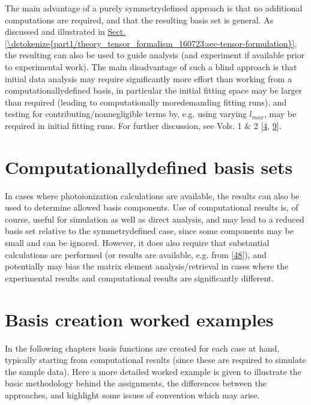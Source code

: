 \documentclass[letterpaper,table,10pt,english]{jupyterBook}
\begin{document}
\sphinxAtStartPar
The main advantage of a purely symmetry\sphinxhyphen{}defined approach is that no additional  computations are required, and that the resulting basis set is general. As discussed and illustrated in \hyperref[\detokenize{part1/theory_tensor_formalism_160723:sec-tensor-formulation}]{Sect.\@ \ref{\detokenize{part1/theory_tensor_formalism_160723:sec-tensor-formulation}}}, the resulting {\hyperref[\detokenize{backmatter/glossary:term-channel-functions}]{}} can also be used to guide analysis (and experiment if available prior to experimental work). The main disadvantage of such a blind approach is that initial data analysis may require significantly more effort than working from a computationally\sphinxhyphen{}defined basis, in particular the initial fitting space may be larger than required (leading to computationally more\sphinxhyphen{}demanding fitting runs), and testing for contributing/non\sphinxhyphen{}negligible terms by, e.g. using varying \(l_{max}\), may be required in initial fitting runs. For further discussion, see  Vols. 1 \& 2 {[}\hyperlink{cite.backmatter/bibliography:id675}{4}, \hyperlink{cite.backmatter/bibliography:id676}{9}{]}.


\section{Computationally\sphinxhyphen{}defined basis sets}
\label{\detokenize{part2/sym-fitting-intro_240723:computationally-defined-basis-sets}}
\sphinxAtStartPar
In cases where photoionization calculations are available, the results can also be used to determine allowed basis components. Use of  computational results is, of course, useful for simulation as well as direct analysis, and may lead to a reduced basis set relative to the symmetry\sphinxhyphen{}defined case, since some components may be small and can be ignored. However, it does also require that substantial calculations are performed (or results are available, e.g. from  {[}\hyperlink{cite.backmatter/bibliography:id677}{48}{]}), and \sphinxhyphen{} potentially \sphinxhyphen{} may bias the matrix element analysis/retrieval in cases where the experimental results and computational results are significantly different.


\section{Basis creation worked examples}
\label{\detokenize{part2/sym-fitting-intro_240723:basis-creation-worked-examples}}
\sphinxAtStartPar
In the following chapters basis functions are created for each case at hand, typically starting from  computational results (since these are required to simulate the sample data). Here a more detailed worked example is given to illustrate the basic methodology behind the assignments, the differences between the approaches, and highlight some issues of convention which may arise.
\end{document}
